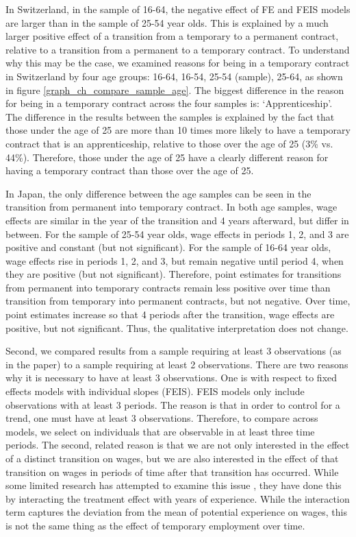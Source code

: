 In Switzerland, in the sample of 16-64, the negative effect of FE and FEIS models are larger than in the sample of 25-54 year olds.  This is explained by a much larger positive effect of a transition from a temporary to a permanent contract, relative to a transition from a permanent to a temporary contract.  To understand why this may be the case, we examined reasons for being in a temporary contract in Switzerland by four age groups: 16-64, 16-54, 25-54 (sample), 25-64, as shown in figure \ref{graph_ch_compare_sample_age}.  The biggest difference in the reason for being in a temporary contract across the four samples is: `Apprenticeship'.  The difference in the results between the samples is explained by the fact that those under the age of 25 are more than 10 times more likely to have a temporary contract that is an apprenticeship, relative to those over the age of 25 (3\% vs. 44\%).  Therefore, those under the age of 25 have a clearly different reason for having a temporary contract than those over the age of 25.  

In Japan, the only difference between the age samples can be seen in the transition from permanent into temporary contract.  In both age samples, wage effects are similar in the year of the transition and 4 years afterward, but differ in between.  For the sample of 25-54 year olds, wage effects in periods 1, 2, and 3 are positive and constant (but not significant).  For the sample of 16-64 year olds, wage effects rise in periods 1, 2, and 3, but remain negative until period 4, when they are positive (but not significant).  Therefore, point estimates for transitions from permanent into temporary contracts remain less positive over time than transition from temporary into permanent contracts, but not negative.  Over time, point estimates increase so that 4 periods after the transition, wage effects are positive, but not significant.  Thus, the qualitative interpretation does not change.

Second, we compared results from a sample requiring at least 3 observations (as in the paper) to a sample requiring at least 2 observations.  There are two reasons why it is necessary to have at least 3 observations.  One is with respect to fixed effects models with individual slopes (FEIS).  FEIS models only include observations with at least 3 periods.  The reason is that in order to control for a trend, one must have at least 3 observations.  Therefore, to compare across models, we select on individuals that are observable in at least three time periods.  The second, related reason is that we are not only interested in the effect of a distinct transition on wages, but we are also interested in the effect of that transition on wages in periods of time after that transition has occurred.  While some limited research has attempted to examine this issue \citep{booth_temporary_2002,mooi-reci_casual_2017}, they have done this by interacting the treatment effect with years of experience.  While the interaction term captures the deviation from the mean of potential experience on wages, this is not the same thing as the effect of temporary employment over time.  

